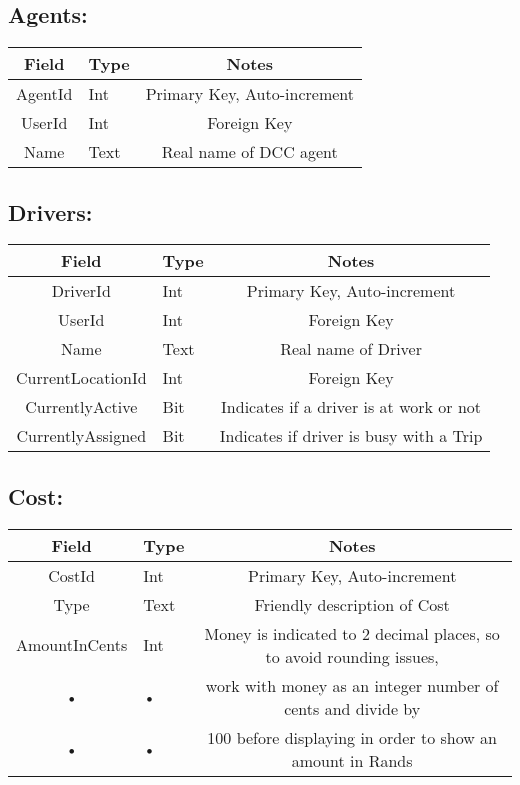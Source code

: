 \documentclass[10pt, onecolumn]{witseiepaper}
\begin{document}
\subsection*{Agents:}
\begin{tabular}{|c|l|c|}
\hline 
Field & Type & Notes\\ 
\hline 
AgentId & Int & Primary Key, Auto-increment\\
\hline 
UserId & Int & Foreign Key\\
\hline 
Name & Text & Real name of DCC agent\\
\hline
\end{tabular}

\subsection*{Drivers:}
\begin{tabular}{|c|l|c|}
\hline 
Field & Type & Notes\\ 
\hline 
DriverId & Int & Primary Key, Auto-increment\\
\hline 
UserId & Int & Foreign Key\\
\hline 
Name & Text & Real name of Driver\\
\hline
CurrentLocationId & Int & Foreign Key\\
\hline
CurrentlyActive & Bit & Indicates if a driver is at work or not\\
\hline
CurrentlyAssigned & Bit & Indicates if driver is busy with a Trip\\
\hline
\end{tabular}

\subsection*{Cost:}
\begin{tabular}{|c|l|c|}
\hline 
Field & Type & Notes\\ 
\hline 
CostId & Int & Primary Key, Auto-increment\\
\hline 
Type & Text & Friendly description of Cost\\
\hline 
AmountInCents & Int & Money is indicated to 2 decimal places, so to avoid rounding issues,\\
• & • & work with money as an integer number of cents and divide by\\ 
• & • & 100 before displaying in order to show an amount in Rands\\
\hline
\end{tabular}
\end{document}
